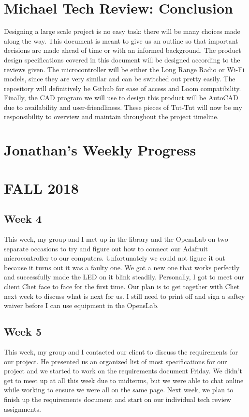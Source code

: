 \documentclass[letterpaper,10pt,draftclsnofoot,onecolumn]{article}
\begin{document}
\section{Michael Tech Review: Conclusion}
Designing a large scale project is no easy task: there will be many choices made along the way. This document is meant to give us an outline so that important decisions are made ahead of time or with an informed background. The product design specifications covered in this document will be designed according to the reviews given. The microcontroller will be either the Long Range Radio or Wi-Fi models, since they are very similar and can be switched out pretty easily. The repository will definitively be Github for ease of access and Loom compatibility. Finally, the CAD program we will use to design this product will be AutoCAD due to availability and user-friendliness. These pieces of Tut-Tut will now be my responsibility to overview and maintain throughout the project timeline.




\pagebreak

\section{Jonathan’s Weekly Progress}

\section{FALL 2018}
\subsection{Week 4}
This week, my group and I met up in the library and the OpensLab on two separate occasions to try and figure out how to connect our Adafruit microcontroller to our computers. Unfortunately we could not figure it out because it turns out it was a faulty one. We got a new one that works perfectly and successfully made the LED on it blink steadily. Personally, I got to meet our client Chet face to face for the first time. Our plan is to get together with Chet next week to discuss what is next for us. I still need to print off and sign a saftey waiver before I can use equipment in the OpensLab.

\subsection{Week 5}
This week, my group and I contacted our client to discuss the requirements for our project. He presented us an organized list of most specifications for our project and we started to work on the requirements document Friday. We didn't get to meet up at all this week due to midterms, but we were able to chat online while working to ensure we were all on the same page. Next week, we plan to finish up the requirements document and start on our individual tech review assignments.
\end{document}
